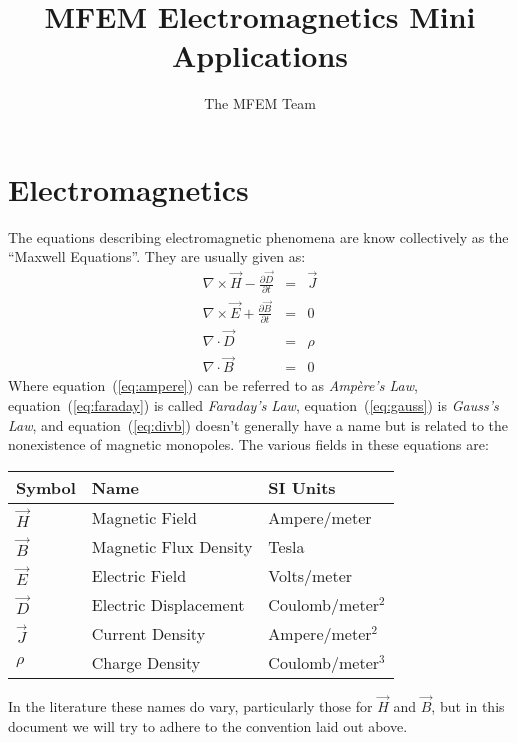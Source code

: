\documentclass{article}
\title{MFEM Electromagnetics Mini Applications}
\author{The MFEM Team}
\newcommand{\refEq}[1]{(\ref{eq:#1})}
\newcommand{\Div}{\nabla\!\cdot\!}
\newcommand{\Curl}{\nabla\!\times\!}
\begin{document}
\maketitle

\section{Electromagnetics}

The equations describing electromagnetic phenomena are know
collectively as the ``Maxwell Equations''.  They are usually given as:
\begin{eqnarray}
\Curl\vec{H} - \frac{\partial\vec{D}}{\partial t} &=& \vec{J} \label{eq:ampere} \\
\Curl\vec{E} + \frac{\partial\vec{B}}{\partial t} &=& 0 \label{eq:faraday} \\
\Div\vec{D} &=& \rho \label{eq:gauss} \\
\Div\vec{B} &=& 0 \label{eq:divb}
\end{eqnarray}
Where equation~\refEq{ampere} can be referred to as {\em Amp\`ere's Law},
equation~\refEq{faraday} is called {\em Faraday's Law},
equation~\refEq{gauss} is {\em Gauss's Law}, and equation~\refEq{divb}
doesn't generally have a name but is related to the nonexistence of
magnetic monopoles.  The various fields in these equations are:
\begin{center}
\begin{tabular}{|l|l|l|}
\hline
Symbol & Name & SI Units \\
\hline
$\vec{H}$ & Magnetic Field & Ampere/meter \\
$\vec{B}$ & Magnetic Flux Density & Tesla \\
$\vec{E}$ & Electric Field & Volts/meter \\
$\vec{D}$ & Electric Displacement & Coulomb/meter$^2$ \\
$\vec{J}$ & Current Density & Ampere/meter$^2$ \\
$\rho$ & Charge Density & Coulomb/meter$^3$ \\
\hline
\end{tabular}
\end{center}
In the literature these names do vary, particularly those for
$\vec{H}$ and $\vec{B}$, but in this document we will try to adhere to
the convention laid out above.
\end{document}
